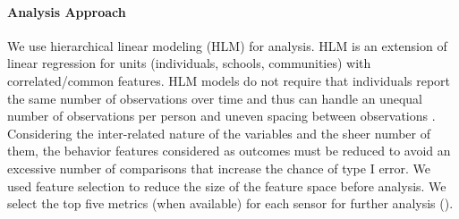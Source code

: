 \paragraph{Analysis Approach}
%
We use hierarchical linear modeling (HLM) for analysis. HLM is an extension of linear regression for units (\eg individuals, schools, communities) with correlated/common features. %
HLM models do not require that individuals report the same number of observations over time and thus can handle an unequal number of observations per person and uneven spacing between observations \cite{maas2005sufficient}. %
Considering the inter-related nature of the variables and the sheer number of them, the behavior features considered as outcomes must be reduced to avoid an excessive number of comparisons that increase the chance of type I error. We used feature selection to reduce the size of the feature space before analysis. We select the top five metrics (when available) for each sensor for further analysis ().


